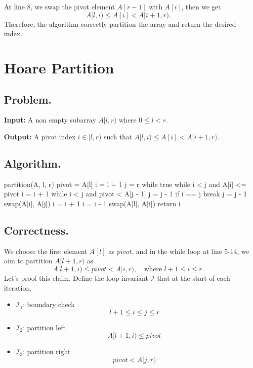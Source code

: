 \documentclass[12pt]{article}
\begin{document}
At line 8, we swap the pivot element \(A[r-1]\) with \(A[i]\), then we get
\[
    A[l, i) \leq A[i] < A[i+1, r).
\]
Therefore, the algorithm correctly partition the array and return the desired index.

\newpage

\section*{Hoare Partition}

\subsection*{Problem.}

\noindent\textbf{Input:} A non empty subarray \(A[l, r)\) where \(0 \leq l < r\).

\noindent\textbf{Output:} A pivot index \(i \in [l, r)\) such that \(A[l, i) \leq A[i] < A[i+1, r)\).

\subsection*{Algorithm.}

\begin{pseudocode}
partition(A, l, r)
    pivot = A[l]
    i = l + 1
    j = r
    while true
        while i < j and A[i] <= pivot
            i = i + 1
        while i < j and pivot < A[j - 1]
            j = j - 1
        if i == j
            break
        j = j - 1
        swap(A[i], A[j])
        i = i + 1
    i = i - 1
    swap(A[l], A[i])
    return i
\end{pseudocode}

\subsection*{Correctness.}

We choose the first element \(A[l]\) as \(pivot\), and in the while loop at line 5-14, we aim to partition \(A[l+1, r)\) as
\[
    A[l+1, i) \leq pivot < A[i, r), \quad \text{where } l + 1 \leq i \leq r.
\]
Let's proof this claim. Define the loop invariant \(\mathcal{I}\) that at the start of each iteration,
\begin{itemize}
    \item \(\mathcal{I}_1\): boundary check
    \[
        l + 1 \leq i \leq j \leq r
    \]
    \item \(\mathcal{I}_2\): partition left
    \[
        A[l + 1, i) \leq pivot
    \]
    \item \(\mathcal{I}_3\): partition right
    \[
        pivot < A[j, r)
    \]
\end{itemize}
\end{document}
